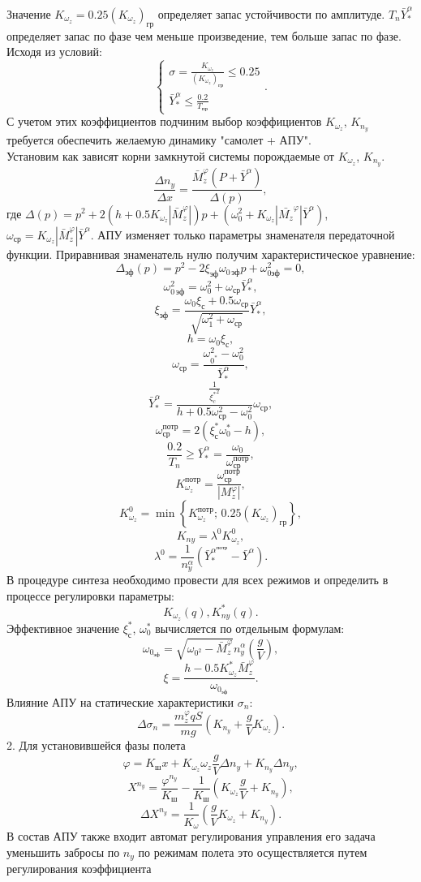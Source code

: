 \documentclass{article}
\begin{document}
Значение $K_{\omega_z} = 0.25(K_{\omega_z})_\text{гр}$ определяет запас
устойчивости по амплитуде. $T_n \bar{Y}_*^\alpha$ определяет запас по фазе чем
меньше произведение, тем больше запас по фазе.
Исходя из условий:
\[
	\begin{cases}
		\sigma = \frac{K_{\omega_z}}{(K_{\omega_z})_\text{гр}} \leq 0.25 \\
		\bar{Y}_*^\alpha \leq \frac{0.2}{T_\text{пр}}
	\end{cases}.
\]
С учетом этих коэффициентов подчиним выбор коэффициентов $K_{\omega_z}$,
$K_{n_y}$ требуется обеспечить желаемую динамику "самолет + АПУ".\\
Установим как зависят корни замкнутой системы порождаемые от $K_{\omega_z}$,
$K_{n_y}$.
\[
	\frac{\Delta n_y}{\Delta x} = \frac{\bar{M}_z^\varphi (P +
		\bar{Y}^\alpha)}{\Delta(p)},
\]
где $\Delta(p) = p^2 + 2(h+0.5 K_{\omega_z} |\bar{M}_z^\varphi|)p + (\omega_0^2
	+ K_{\omega_z}|\bar{M_z}^\varphi|\bar{Y}^\alpha)$, $\omega_\text{ср} =
	K_{\omega_z} |\bar{M}_z^\varphi| \bar{Y}^\alpha$.
АПУ изменяет только параметры знаменателя передаточной функции.
Приравнивая знаменатель нулю получим характеристическое уравнение:
\[
	\Delta_\text{эф}(p)= p^2 - 2 \xi_\text{эф}\omega_{0 \, \text{эф}}p +
	\omega_{0 \text{эф}}^2 = 0,
\]
\[
	\omega_{0 \, \text{эф}}^2 = \omega_0^2 + \omega_\text{ср}\bar{Y}^\alpha_*,
\]
\[
	\xi_\text{эф} = \frac{\omega_0 \xi_\text{с}
		+0.5\omega_\text{ср}}{\sqrt{\omega_1^2 + \omega_\text{ср}}}
	\bar{Y}^{\alpha}_* ,
\]
\[
	h = \omega_0 \xi_\text{с},
\]
\[
	\omega_\text{ср}= \frac{\omega_{0^*}^2 - \omega_0^2}{\bar{Y}^{\alpha}_*},
\]
\[
	\bar{Y}^{\alpha}_* = \frac{\frac{1}{{\xi_c^*}^2}}{h + 0.5
		\omega_\text{ср}^2- \omega_0^2}{\omega_\text{ср}},
\]
\[
	\omega_\text{ср}^{\text{потр}} = 2(\xi_\text{с}^* \omega_0^* - h),
\]
\[
	\frac{0.2}{T_n} \geq \bar{Y}^{\alpha}_* =
	\frac{\omega_0}{\omega_\text{ср}^{\text{потр}}},
\]
\[
	K_{\omega_z}^{\text{потр}} =
	\frac{\omega_\text{ср}^{\text{потр}}}{|M_z^{\varphi}|},
\]
\[
	K_{\omega_z}^0 = \min \left\{ K_{\omega_z}^{\text{потр}}; \,
	0.25(K_{\omega_z})_\text{гр} \right\},
\]
\[
	K_{ny}= \lambda^0 K^0_{\omega_z},
\]
\[
	\lambda^0 = \frac{1}{n_y^\alpha}(\bar{Y}^{\alpha^{\text{потр}}}_* -
	\bar{Y}^\alpha).
\]
В процедуре синтеза необходимо провести для всех режимов и определить в
процессе регулировки параметры:
\[
	K_{\omega_z}(q), K_{ny}^*(q).
\]
Эффективное значение $\xi_\text{с}^*$, $\omega_0^*$ вычисляется по отдельным
формулам:
\[
	\omega_{0_\text{эф}} = \sqrt{\omega_{0^{2}} -\bar{M}_z^{\varphi}}
	n_y^{\alpha}(\frac{g}{V}),
\]
\[
	\xi = \frac{h - 0.5 K_{\omega_z}^*
	\bar{M}_z^{\varphi}}{\omega_{0_\text{эф}}}.
\]
Влияние АПУ на статические характеристики $\sigma_n$:
\[
	\Delta \sigma_n = \frac{m_z^\varphi q S}{mg}(K_{n_y} +
	\frac{g}{V}K_{\omega_z}).
\]
2. Для установившейся фазы полета
\[
	\varphi = K_\text{ш}x + K_{\omega_z} \omega_z \frac{g}{V}\Delta n_y +
	K_{n_y} \Delta n_y,
\]
\[
	X^{n_y} = \frac{\varphi^{n_y}}{K_\text{ш}} - \frac{1}{K_\text{ш}}
	(K_{\omega_z} \frac{g}{V} + K_{n_y}),
\]
\[
	\Delta X^{n_y}= \frac{1}{K_\omega} (\frac{g}{V} K_{\omega_z}+ K_{n_y}).
\]
В состав АПУ также входит автомат регулирования управления его задача уменьшить
забросы по $n_y$ по режимам полета это осуществляется путем регулирования
коэффициента
\end{document}

